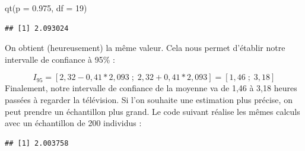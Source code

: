 \documentclass[
]{book}
\newenvironment{Shaded}{\begin{snugshade}}{\end{snugshade}}
\newcommand{\AttributeTok}[1]{\textcolor[rgb]{0.77,0.63,0.00}{#1}}
\newcommand{\CommentTok}[1]{\textcolor[rgb]{0.56,0.35,0.01}{\textit{#1}}}
\newcommand{\DecValTok}[1]{\textcolor[rgb]{0.00,0.00,0.81}{#1}}
\newcommand{\FloatTok}[1]{\textcolor[rgb]{0.00,0.00,0.81}{#1}}
\newcommand{\FunctionTok}[1]{\textcolor[rgb]{0.00,0.00,0.00}{#1}}
\newcommand{\NormalTok}[1]{#1}
\newcommand{\OtherTok}[1]{\textcolor[rgb]{0.56,0.35,0.01}{#1}}
\newcommand{\SpecialCharTok}[1]{\textcolor[rgb]{0.00,0.00,0.00}{#1}}
\begin{document}
\begin{Shaded}
\begin{Highlighting}[]
\FunctionTok{qt}\NormalTok{(}\AttributeTok{p =} \FloatTok{0.975}\NormalTok{, }\AttributeTok{df =} \DecValTok{19}\NormalTok{)}
\end{Highlighting}
\end{Shaded}

\begin{verbatim}
## [1] 2.093024
\end{verbatim}

On obtient (heureusement) la même valeur. Cela nous permet d'établir notre intervalle de confiance à 95\% :

\[ I_{95} = [2,32-0,41*2,093 \;;\;  2,32 + 0,41*2,093] = [1,46 \;;\; 3,18] \]
Finalement, notre intervalle de confiance de la moyenne va de 1,46 à 3,18 heures passées à regarder la télévision. Si l'on souhaite une estimation plus précise, on peut prendre un échantillon plus grand. Le code suivant réalise les mêmes calculs avec un échantillon de 200 individus :

\begin{Shaded}
\end{Shaded}

\begin{verbatim}
## [1] 2.003758
\end{verbatim}

\begin{Shaded}
\end{Shaded}
\end{document}
